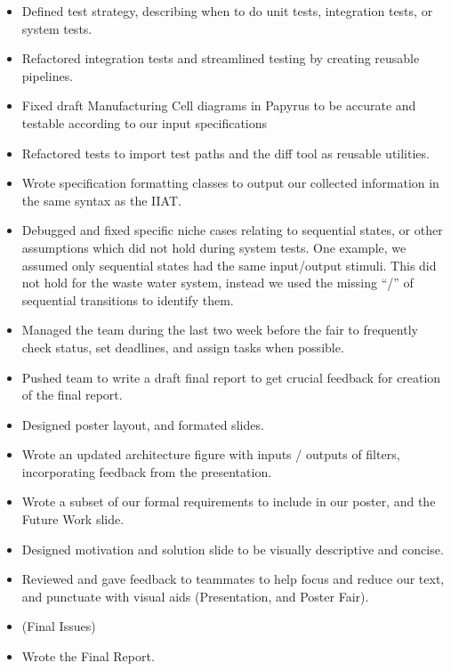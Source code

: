 \begin{itemize}
    \item Defined test strategy, describing when to do unit tests, integration tests, or system tests.
    \item Refactored integration tests and streamlined testing by creating reusable pipelines.
    \item Fixed draft Manufacturing Cell diagrams in Papyrus to be accurate and testable according to our input specifications
    \item Refactored tests to import test paths and the diff tool as reusable utilities.
    \item Wrote specification formatting classes to output our collected information in the same syntax as the IIAT\@.
    \item Debugged and fixed specific niche cases relating to sequential states, or other assumptions which did not hold during system tests.
    One example, we assumed only sequential states had the same input/output stimuli.
    This did not hold for the waste water system, instead we used the missing ``/'' of sequential transitions to identify them.
    \item Managed the team during the last two week before the fair to frequently check status, set deadlines, and assign tasks when possible.
    \item Pushed team to write a draft final report to get crucial feedback for creation of the final report.
    \item Designed poster layout, and formated slides.
    \item Wrote an updated architecture figure with inputs / outputs of filters, incorporating feedback from the presentation.
    \item Wrote a subset of our formal requirements to include in our poster, and the Future Work slide.
    \item Designed motivation and solution slide to be visually descriptive and concise.
    \item Reviewed and gave feedback to teammates to help focus and reduce our text, and punctuate with visual aids (Presentation, and Poster Fair).
    \item (Final Issues)
    \item Wrote the Final Report.
\end{itemize}

